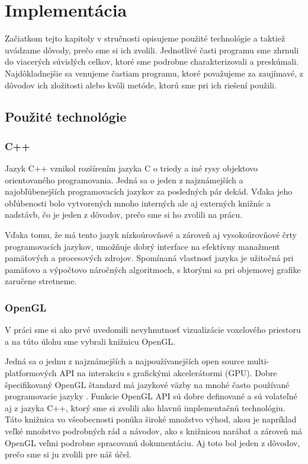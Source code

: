 \chapter{Implementácia}\label{chap:implementacia}
Začiatkom tejto kapitoly v stručnosti opisujeme použité technológie a taktiež uvádzame dôvody, prečo sme si ich zvolili. 
Jednotlivé časti programu sme zhrnuli do viacerých súvislých celkov, ktoré sme podrobne charakterizovali a preskúmali. Najdôkladnejšie sa venujeme častiam programu, ktoré považujeme za zaujímavé, z dôvodov ich zložitosti alebo kvôli metóde, ktorú sme pri ich riešení použili. 

\section{Použité technológie}

\subsection{C++}
Jazyk C++ vznikol rozšírením jazyka C o triedy a iné rysy objektovo orientovaného programovania. Jedná sa o 
jeden z najznámejších a najobľúbenejších programovacích jazykov za posledných pár dekád. Vďaka jeho obľúbenosti bolo vytvorených mnoho interných ale aj externých knižníc a nadstávb, čo je jeden z dôvodov, prečo sme si ho zvolili na prácu. 

Vďaka tomu, že má tento jazyk nízkoúrovňové a zároveň aj vysokoúrovňové črty programovacích jazykov, umožňuje dobrý interface na efektívny manažment pamäťových a procesových zdrojov. Spomínaná vlastnosť jazyka je užitočná pri pamäťovo a výpočtovo náročných algoritmoch, s ktorými sa pri objemovej grafike zaručene stretneme.

\subsection{OpenGL}
V práci sme si ako prvé uvedomili nevyhnutnosť vizualizácie voxelového priestoru a na túto úlohu sme vybrali knižnicu OpenGL.

Jedná sa o jednu z najznámejších a najpoužívanejších open source multi-platformových API na interakciu s grafickými akcelerátormi (GPU). Dobre špecifikovaný OpenGL štandard má jazykové väzby na mnohé často používané programovacie jazyky \cite{OpenGL}.
Funkcie OpenGL API sú dobre definované a sú volateľné aj z jazyka C++, ktorý sme si zvolili ako hlavnú implementačnú technológiu. Táto knižnica vo všeobecnosti ponúka široké množstvo výhod, akou je napríklad veľké množstvo podrobných rád a návodov, ako s knižnicou narábať a zároveň má OpenGL veľmi podrobne spracovanú dokumentáciu. Aj toto bol jeden z dôvodov, prečo sme si ju zvolili pre náš účel.

